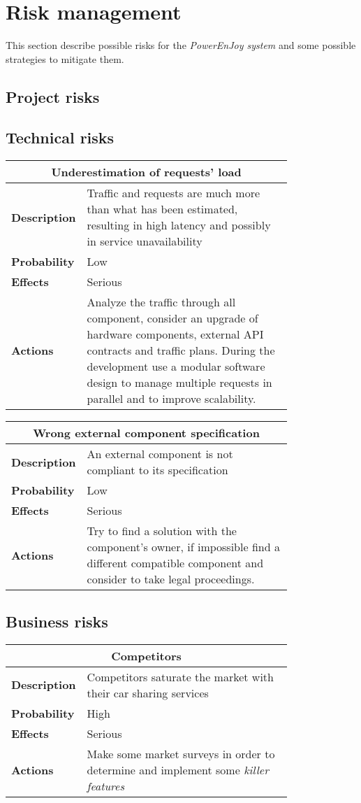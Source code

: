 \section{Risk management}\label{sec:riskManagement}
This section describe possible risks for the \emph{PowerEnJoy system} and some possible strategies to mitigate them.
\subsection{Project risks}
\subsection{Technical risks}
\begin{longtable}{lp{0.8\linewidth}}
\multicolumn{2}{c}{\textbf{Underestimation of requests' load}}\\
\toprule
\textbf{Description}&Traffic and requests are much more than what has been estimated, resulting in high latency and possibly in service unavailability\\
\midrule
\textbf{Probability}&Low\\
\midrule
\textbf{Effects}&Serious\\
\midrule
\textbf{Actions}&Analyze the traffic through all component, consider an upgrade of hardware components, external API contracts and traffic plans. During the development use a modular software design to manage multiple requests in parallel and to improve scalability.\\
\bottomrule
\end{longtable}

\begin{longtable}{lp{0.8\linewidth}}
\multicolumn{2}{c}{\textbf{Wrong external component specification}}\\
\toprule
\textbf{Description}&An external component is not compliant to its specification\\
\midrule
\textbf{Probability}&Low\\
\midrule
\textbf{Effects}&Serious\\
\midrule
\textbf{Actions}&Try to find a solution with the component's owner, if impossible find a different compatible component and consider to take legal proceedings.\\
\bottomrule
\end{longtable}

\subsection{Business risks}
\begin{longtable}{lp{0.8\linewidth}}
\multicolumn{2}{c}{\textbf{Competitors}}\\
\toprule
\textbf{Description}&Competitors saturate the market with their car sharing services\\
\midrule
\textbf{Probability}&High\\
\midrule
\textbf{Effects}&Serious\\
\midrule
\textbf{Actions}&Make some market surveys in order to determine and implement some \emph{killer features}\\
\bottomrule
\end{longtable}

